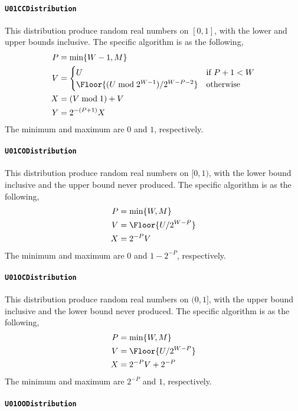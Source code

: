 \paragraph{\texttt{U01CCDistribution}}

This distribution produce random real numbers on $[0, 1]$, with the lower and
upper bounds inclusive. The specific algorithm is as the following,
\begin{align*}
  P &= \min\{W - 1, M\} \\
  V &= \begin{cases}
    U &\text{if } P + 1 < W \\
    \Floor{(U \bmod 2^{W - 1}) / 2^{W - P -2}} &\text{otherwise}
  \end{cases} \\
  X &= (V \bmod 1) + V \\
  Y &= 2^{-(P + 1)} X
\end{align*}
The minimum and maximum are $0$ and $1$, respectively.

\paragraph{\texttt{U01CODistribution}}

This distribution produce random real numbers on $[0, 1)$, with the lower bound
inclusive and the upper bound never produced. The specific algorithm is as the
following,
\begin{align*}
  P &= \min\{W, M\} \\
  V &= \Floor{U / 2^{W - P}} \\
  X &= 2^{-P} V
\end{align*}
The minimum and maximum are $0$ and $1 - 2^{-P}$, respectively.

\paragraph{\texttt{U01OCDistribution}}

This distribution produce random real numbers on $(0, 1]$, with the upper bound
inclusive and the lower bound never produced. The specific algorithm is as the
following,
\begin{align*}
  P &= \min\{W, M\} \\
  V &= \Floor{U / 2^{W - P}} \\
  X &= 2^{-P} V + 2^{-P}
\end{align*}
The minimum and maximum are $2^{-P}$ and $1$, respectively.

\paragraph{\texttt{U01OODistribution}}

